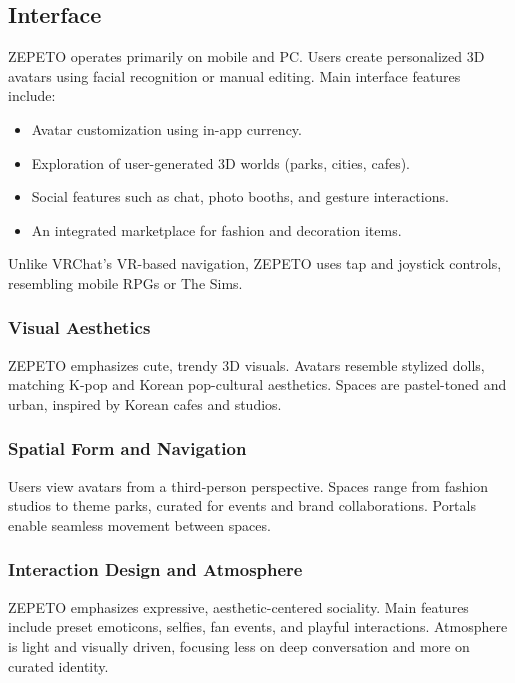 \subsection{Interface}
ZEPETO operates primarily on mobile and PC. Users create personalized 3D avatars using facial recognition or manual editing. Main interface features include:
\begin{itemize}
    \item Avatar customization using in-app currency.
    \item Exploration of user-generated 3D worlds (parks, cities, cafes).
    \item Social features such as chat, photo booths, and gesture interactions.
    \item An integrated marketplace for fashion and decoration items.
\end{itemize}

Unlike VRChat’s VR-based navigation, ZEPETO uses tap and joystick controls, resembling mobile RPGs or The Sims.  

\subsubsection{Visual Aesthetics}
ZEPETO emphasizes cute, trendy 3D visuals. Avatars resemble stylized dolls, matching K-pop and Korean pop-cultural aesthetics. Spaces are pastel-toned and urban, inspired by Korean cafes and studios.  

\subsubsection{Spatial Form and Navigation}
Users view avatars from a third-person perspective. Spaces range from fashion studios to theme parks, curated for events and brand collaborations. Portals enable seamless movement between spaces.  

\subsubsection{Interaction Design and Atmosphere}
ZEPETO emphasizes expressive, aesthetic-centered sociality. Main features include preset emoticons, selfies, fan events, and playful interactions. Atmosphere is light and visually driven, focusing less on deep conversation and more on curated identity.  

\clearpage

